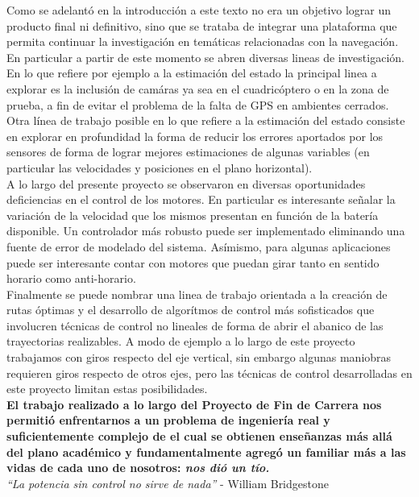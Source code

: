 \documentclass[main]{subfiles}
\begin{document}
Como se adelant\'o en la introducci\'on a este texto no era un objetivo lograr un producto final ni definitivo, sino que se trataba de integrar una plataforma que permita continuar la investigaci\'on en tem\'aticas relacionadas con la navegaci\'on. En particular a partir de este momento se abren diversas lineas de investigaci\'on. En lo que refiere por ejemplo a la estimaci\'on del estado la principal linea a explorar es la inclusi\'on de cam\'aras ya sea en el cuadric\'optero o en la zona de prueba, a fin de evitar el problema de la falta de GPS en ambientes cerrados. Otra línea de trabajo posible en lo que refiere a la estimaci\'on del estado consiste en explorar en profundidad la forma de reducir los errores aportados por los sensores de forma de lograr mejores estimaciones de algunas variables (en particular las velocidades y posiciones en el plano horizontal).\\

A lo largo del presente proyecto se observaron en diversas oportunidades deficiencias en el control de los motores. En particular es interesante señalar la variaci\'on de la velocidad que los mismos presentan en funci\'on de la bater\'ia disponible. Un controlador m\'as robusto puede ser implementado eliminando una fuente de error de modelado del sistema. As\'imismo, para algunas aplicaciones puede ser interesante contar con motores que puedan girar tanto en sentido horario como anti-horario.\\

Finalmente se puede nombrar una linea de trabajo orientada a la creaci\'on de rutas \'optimas y el desarrollo de algor\'itmos de control m\'as sofisticados que involucren t\'ecnicas de control no lineales de forma de abrir el abanico de las trayectorias realizables. A modo de ejemplo a lo largo de este proyecto trabajamos con giros respecto del eje vertical, sin embargo algunas maniobras requieren giros respecto de otros ejes, pero las t\'ecnicas de control desarrolladas en este proyecto limitan estas posibilidades.\\

\textbf{El trabajo realizado a lo largo del Proyecto de Fin de Carrera nos permiti\'o enfrentarnos a un problema de ingenier\'ia real y suficientemente complejo de el cual se obtienen enseñanzas m\'as all\'a del plano acad\'emico y fundamentalmente agreg\'o un familiar m\'as a las vidas de cada uno de nosotros: \emph{nos di\'o un t\'io.}}\\

\emph{``La potencia sin control no sirve de nada''} - William Bridgestone
\end{document}
